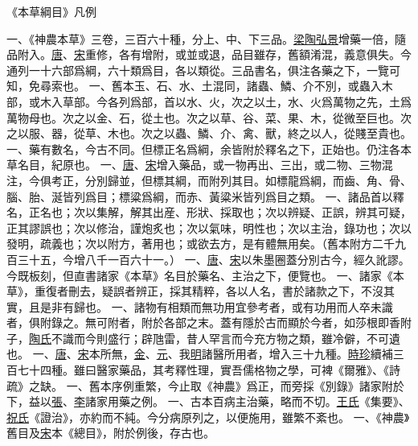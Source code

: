 《本草綱目》凡例

一、《神農本草》三卷，三百六十種，分上、中、下三品。\ul{梁}\ul{陶弘景}增藥一倍，隨品附入。\ul{唐}、\ul{宋}重修，各有增附，或並或退，品目雖存，舊額淆混，義意俱失。今通列一十六部爲綱，六十類爲目，各以類從。三品書名，俱注各藥之下，一覽可知，免尋索也。
一、舊本玉、石、水、土混同，諸蟲、鱗、介不別，或蟲入木部，或木入草部。今各列爲部，首以水、火，次之以土，水、火爲萬物之先，土爲萬物母也。次之以金、石，從土也。次之以草、谷、菜、果、木，從微至巨也。次之以服、器，從草、木也。次之以蟲、鱗、介、禽、獸，終之以人，從賤至貴也。
一、藥有數名，今古不同。但標正名爲綱，余皆附於釋名之下，正始也。仍注各本草名目，紀原也。
一、\ul{唐}、\ul{宋}增入藥品，或一物再出、三出，或二物、三物混注，今俱考正，分別歸並，但標其綱，而附列其目。如標龍爲綱，而齒、角、骨、腦、胎、涎皆列爲目；標粱爲綱，而赤、黃粱米皆列爲目之類。
一、諸品首以釋名，正名也；次以集解，解其出産、形狀、採取也；次以辨疑、正誤，辨其可疑，正其謬誤也；次以修治，謹炮炙也；次以氣味，明性也；次以主治，錄功也；次以發明，疏義也；次以附方，著用也；或欲去方，是有體無用矣。（舊本附方二千九百三十五，今增八千一百六十一。）
一、\ul{唐}、\ul{宋}以朱墨圈蓋分別古今，經久訛謬。今既板刻，但直書諸家《本草》名目於藥名、主治之下，便覽也。
一、諸家《本草》，重復者刪去，疑誤者辨正，採其精粹，各以人名，書於諸款之下，不沒其實，且是非有歸也。
一、諸物有相類而無功用宜參考者，或有功用而人卒未識者，俱附錄之。無可附者，附於各部之末。蓋有隱於古而顯於今者，如莎根即香附子，\ul{陶氏}不識而今則盛行；辟虺雷，昔人罕言而今充方物之類，雖冷僻，不可遺也。
一、\ul{唐}、\ul{宋}本所無，\ul{金}、\ul{元}、我\ul{明}諸醫所用者，增入三十九種。\ul{時珍}續補三百七十四種。雖曰醫家藥品，其考釋性理，實吾儒格物之學，可裨《爾雅》、《詩疏》之缺。
一、舊本序例重繁，今止取《神農》爲正，而旁採《別錄》諸家附於下，益以\ul{張}、\ul{李}諸家用藥之例。
一、古本百病主治藥，略而不切。\ul{王氏}《集要》、\ul{祝氏}《證治》，亦約而不純。今分病原列之，以便施用，雖繁不紊也。
一、《神農》舊目及\ul{宋}本《總目》，附於例後，存古也。